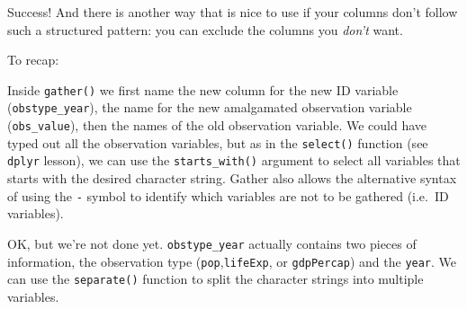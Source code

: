 \documentclass[]{book}
\newenvironment{Shaded}{\begin{snugshade}}{\end{snugshade}}
\newcommand{\KeywordTok}[1]{\textcolor[rgb]{0.13,0.29,0.53}{\textbf{{#1}}}}
\newcommand{\DataTypeTok}[1]{\textcolor[rgb]{0.13,0.29,0.53}{{#1}}}
\newcommand{\StringTok}[1]{\textcolor[rgb]{0.31,0.60,0.02}{{#1}}}
\newcommand{\NormalTok}[1]{{#1}}
\theoremstyle{definition}
\theoremstyle{definition}
\theoremstyle{definition}
\theoremstyle{remark}
\begin{document}
\begin{Shaded}
\end{Shaded}

Success! And there is another way that is nice to use if your columns
don't follow such a structured pattern: you can exclude the columns you
\emph{don't} want.

\begin{Shaded}
\end{Shaded}

To recap:

Inside \texttt{gather()} we first name the new column for the new ID
variable (\texttt{obstype\_year}), the name for the new amalgamated
observation variable (\texttt{obs\_value}), then the names of the old
observation variable. We could have typed out all the observation
variables, but as in the \texttt{select()} function (see \texttt{dplyr}
lesson), we can use the \texttt{starts\_with()} argument to select all
variables that starts with the desired character string. Gather also
allows the alternative syntax of using the \texttt{-} symbol to identify
which variables are not to be gathered (i.e.~ID variables).

OK, but we're not done yet. \texttt{obstype\_year} actually contains two
pieces of information, the observation type
(\texttt{pop},\texttt{lifeExp}, or \texttt{gdpPercap}) and the
\texttt{year}. We can use the \texttt{separate()} function to split the
character strings into multiple variables.
\end{document}
